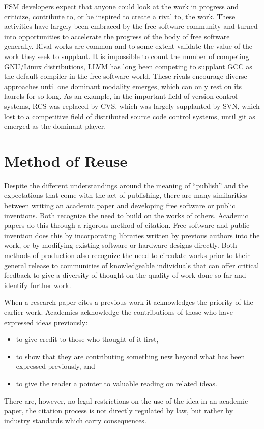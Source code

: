 \documentclass[
	fontsize=10pt, %
	twoside=false, %
	secnumdepth=1, %
]{kaobook}
\begin{document}
FSM developers expect that anyone could look at the work in progress
and criticize, contribute to, or be inspired to create a rival to, the
work. These activities have largely been embraced by the free software
community and turned into opportunities to accelerate the progress of
the body of free software generally. Rival works are common and to
some extent validate the value of the work they seek to supplant. It
is impossible to count the number of competing GNU/Linux
distributions, LLVM has long been competing to supplant GCC as the
default compiler in the free software world. These rivals encourage
diverse approaches until one dominant modality emerges, which can only
rest on its laurels for so long. As an example, in the important field
of version control systems, RCS was replaced by CVS, which was largely
supplanted by SVN, which lost to a competitive field of distributed
source code control systems, until git as emerged as the dominant
player.

\section{Method of Reuse}

Despite the different understandings around the meaning of “publish”
and the expectations that come with the act of publishing, there are
many similarities between writing an academic paper and developing
free software or public inventions. Both recognize the need to build on the works of
others. Academic papers do this through a rigorous method of
citation. Free software and public invention does this by incorporating libraries written
by previous authors into the work, or by modifying existing software or hardware designs
directly. Both methods of production also recognize the need to
circulate works prior to their general release to communities of
knowledgeable individuals that can offer critical feedback to give a
diversity of thought on the quality of work done so far and identify
further work.

When a research paper cites a previous work it acknowledges the priority of the earlier work.
Academics acknowledge the contributions of those who have expressed ideas previously:
\begin{itemize}
\item to give credit to those who thought of it first,
\item to show that they are contributing something new beyond what has been expressed previously, and
\item to give the reader a pointer to valuable reading on related ideas.
\end{itemize}
There are, however, no legal restrictions on the use of the idea in an
academic paper, the citation process is not directly regulated by law,
but rather by industry standards which carry consequences.
\end{document}
